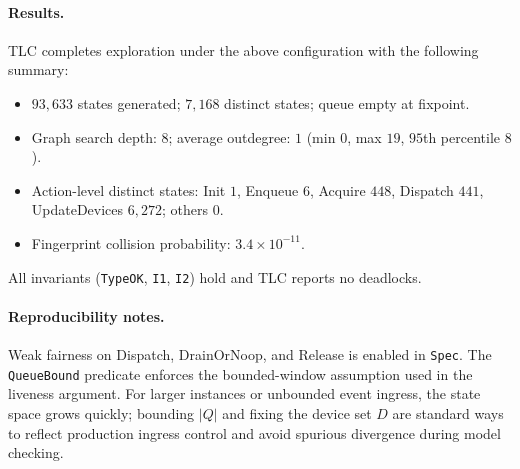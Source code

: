 \documentclass[10pt]{article} %
\newcommand{\ufo}{\textsc{UFO}$^3$\xspace}
\begin{document}
\paragraph{Results.}
TLC completes exploration under the above configuration with the following summary:
\begin{itemize}
  \item $93{,}633$ states generated; $7{,}168$ distinct states; queue empty at fixpoint.
  \item Graph search depth: $8$; average outdegree: $1$ (min $0$, max $19$, $95$th percentile $8$).
  \item Action-level distinct states: \textsf{Init} $1$, \textsf{Enqueue} $6$, \textsf{Acquire} $448$, \textsf{Dispatch} $441$, \textsf{UpdateDevices} $6{,}272$; others $0$.
  \item Fingerprint collision probability: $3.4\times 10^{-11}$.
\end{itemize}
All invariants (\texttt{TypeOK}, \texttt{I1}, \texttt{I2}) hold and TLC reports no deadlocks.

\paragraph{Reproducibility notes.}
Weak fairness on \textsf{Dispatch}, \textsf{DrainOrNoop}, and \textsf{Release} is enabled in \texttt{Spec}. The \texttt{QueueBound} predicate enforces the bounded-window assumption used in the liveness argument. For larger instances or unbounded event ingress, the state space grows quickly; bounding $|Q|$ and fixing the device set $D$ are standard ways to reflect production ingress control and avoid spurious divergence during model checking.







\end{document}
